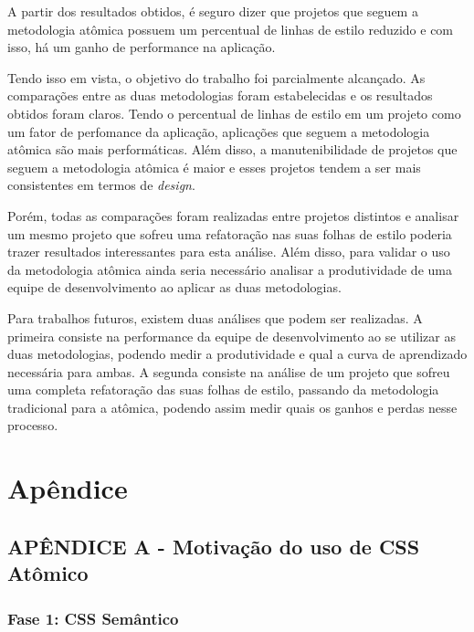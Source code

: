A partir dos resultados obtidos, é seguro dizer que projetos que seguem a metodologia atômica possuem um percentual de linhas de estilo reduzido e com isso, há um ganho de performance na aplicação.

Tendo isso em vista, o objetivo do trabalho foi parcialmente alcançado. As comparações entre as duas metodologias foram estabelecidas e os resultados obtidos foram claros. Tendo o percentual de linhas de estilo em um projeto como um fator de perfomance da aplicação, aplicações que seguem a metodologia atômica são mais performáticas. Além disso, a manutenibilidade de projetos que seguem a metodologia atômica é maior e esses projetos tendem a ser mais consistentes em termos de \emph{design}.

Porém, todas as comparações foram realizadas entre projetos distintos e analisar um mesmo projeto que sofreu uma refatoração nas suas folhas de estilo poderia trazer resultados interessantes para esta análise. Além disso, para validar o uso da metodologia atômica ainda seria necessário analisar a produtividade de uma equipe de desenvolvimento ao aplicar as duas metodologias.

Para trabalhos futuros, existem duas análises que podem ser realizadas. A primeira consiste na performance da equipe de desenvolvimento ao se utilizar as duas metodologias, podendo medir a produtividade e qual a curva de aprendizado necessária para ambas. A segunda consiste na análise de um projeto que sofreu uma completa refatoração das suas folhas de estilo, passando da metodologia tradicional para a atômica, podendo assim medir quais os ganhos e perdas nesse processo.  
\nocite{hooks}

 

\hypertarget{apuxeandice}{%
\chapter{Apêndice}\label{apuxeandice}}

\hypertarget{apuxeandice-a---motivauxe7uxe3o-do-uso-de-css-atuxf4mico}{%
\section{APÊNDICE A - Motivação do uso de CSS
Atômico}\label{apuxeandice-a---motivauxe7uxe3o-do-uso-de-css-atuxf4mico}}

\hypertarget{fase-1-css-semuxe2ntico}{%
\subsection{Fase 1: CSS Semântico}\label{fase-1-css-semuxe2ntico}}

